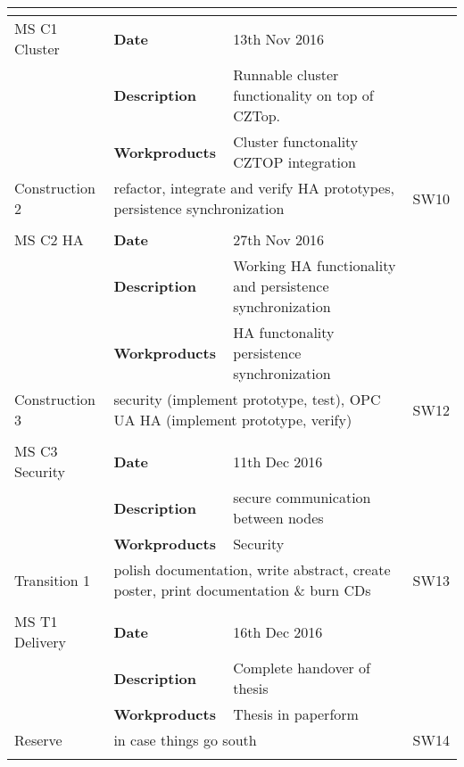 \begin{center}
\begin{longtable}{|p{2.5cm}|p{5.5cm} p{5.5cm}|p{1.0cm}|}
					& \multicolumn{2}{|l|}{}											 												&		\\ \hline
	MS C1 Cluster	& \textbf{Date} 					& 13th Nov 2016																	& 		\\
					& \textbf{Description}				& Runnable cluster functionality on top of CZTop.								&		\\
					& \textbf{Workproducts}				& Cluster functonality \newline CZTOP integration 						 		&		\\ \hline
	Construction 2	& \multicolumn{2}{|l|}{refactor, integrate and verify HA prototypes, persistence synchronization}					& SW10	\\
					& \multicolumn{2}{|l|}{}											 												&		\\ \hline
	MS C2 HA		& \textbf{Date} 					& 27th Nov 2016																	& 		\\
					& \textbf{Description}				& Working HA functionality and persistence synchronization						&		\\
					& \textbf{Workproducts}				& HA functonality \newline persistence synchronization					 		&		\\ \hline
	Construction 3	& \multicolumn{2}{|l|}{security (implement prototype, test), OPC UA HA (implement prototype, verify)}				& SW12	\\
					& \multicolumn{2}{|l|}{}											 												&		\\ \hline
	MS C3 Security	& \textbf{Date} 					& 11th Dec 2016																	& 		\\
					& \textbf{Description}				& secure communication between nodes											&		\\
					& \textbf{Workproducts}				& Security													 					&		\\ \hline
	Transition 1	& \multicolumn{2}{|l|}{polish documentation, write abstract, create poster, print documentation \& burn CDs}		& SW13	\\
					& \multicolumn{2}{|l|}{}											 												&		\\ \hline
	MS T1 Delivery	& \textbf{Date} 					& 16th Dec 2016																	& 		\\
					& \textbf{Description}				& Complete handover of thesis													&		\\
					& \textbf{Workproducts}				& Thesis in paperform													 		&		\\ \hline
	Reserve			& \multicolumn{2}{|l|}{in case things go south}																		& SW14	\\
					& \multicolumn{2}{|l|}{}											 												&		\\ \hline
	
		
   \end{longtable}
\end{center}

